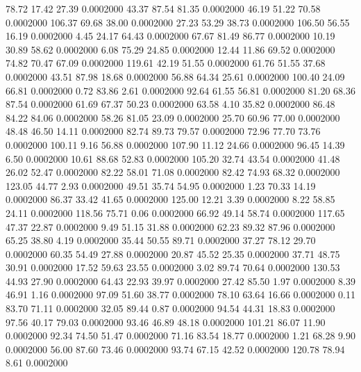   78.72   17.42   27.39   0.0002000
  43.37   87.54   81.35   0.0002000
  46.19   51.22   70.58   0.0002000
 106.37   69.68   38.00   0.0002000
  27.23   53.29   38.73   0.0002000
 106.50   56.55   16.19   0.0002000
   4.45   24.17   64.43   0.0002000
  67.67   81.49   86.77   0.0002000
  10.19   30.89   58.62   0.0002000
   6.08   75.29   24.85   0.0002000
  12.44   11.86   69.52   0.0002000
  74.82   70.47   67.09   0.0002000
 119.61   42.19   51.55   0.0002000
  61.76   51.55   37.68   0.0002000
  43.51   87.98   18.68   0.0002000
  56.88   64.34   25.61   0.0002000
 100.40   24.09   66.81   0.0002000
   0.72   83.86    2.61   0.0002000
  92.64   61.55   56.81   0.0002000
  81.20   68.36   87.54   0.0002000
  61.69   67.37   50.23   0.0002000
  63.58    4.10   35.82   0.0002000
  86.48   84.22   84.06   0.0002000
  58.26   81.05   23.09   0.0002000
  25.70   60.96   77.00   0.0002000
  48.48   46.50   14.11   0.0002000
  82.74   89.73   79.57   0.0002000
  72.96   77.70   73.76   0.0002000
 100.11    9.16   56.88   0.0002000
 107.90   11.12   24.66   0.0002000
  96.45   14.39    6.50   0.0002000
  10.61   88.68   52.83   0.0002000
 105.20   32.74   43.54   0.0002000
  41.48   26.02   52.47   0.0002000
  82.22   58.01   71.08   0.0002000
  82.42   74.93   68.32   0.0002000
 123.05   44.77    2.93   0.0002000
  49.51   35.74   54.95   0.0002000
   1.23   70.33   14.19   0.0002000
  86.37   33.42   41.65   0.0002000
 125.00   12.21    3.39   0.0002000
   8.22   58.85   24.11   0.0002000
 118.56   75.71    0.06   0.0002000
  66.92   49.14   58.74   0.0002000
 117.65   47.37   22.87   0.0002000
   9.49   51.15   31.88   0.0002000
  62.23   89.32   87.96   0.0002000
  65.25   38.80    4.19   0.0002000
  35.44   50.55   89.71   0.0002000
  37.27   78.12   29.70   0.0002000
  60.35   54.49   27.88   0.0002000
  20.87   45.52   25.35   0.0002000
  37.71   48.75   30.91   0.0002000
  17.52   59.63   23.55   0.0002000
   3.02   89.74   70.64   0.0002000
 130.53   44.93   27.90   0.0002000
  64.43   22.93   39.97   0.0002000
  27.42   85.50    1.97   0.0002000
   8.39   46.91    1.16   0.0002000
  97.09   51.60   38.77   0.0002000
  78.10   63.64   16.66   0.0002000
   0.11   83.70   71.11   0.0002000
  32.05   89.44    0.87   0.0002000
  94.54   44.31   18.83   0.0002000
  97.56   40.17   79.03   0.0002000
  93.46   46.89   48.18   0.0002000
 101.21   86.07   11.90   0.0002000
  92.34   74.50   51.47   0.0002000
  71.16   83.54   18.77   0.0002000
   1.21   68.28    9.90   0.0002000
  56.00   87.60   73.46   0.0002000
  93.74   67.15   42.52   0.0002000
 120.78   78.94    8.61   0.0002000
